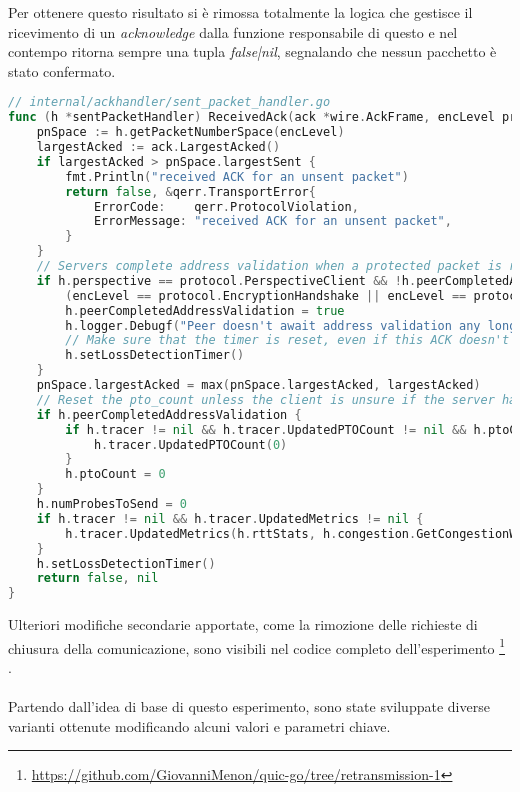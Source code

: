 Per ottenere questo risultato si è rimossa totalmente la logica che gestisce il ricevimento di un \emph{acknowledge} dalla funzione responsabile di questo e nel contempo ritorna sempre una tupla \emph{false|nil}, 
segnalando che nessun pacchetto è stato confermato.
\\
\begin{lstlisting}[language=Go]
// internal/ackhandler/sent_packet_handler.go
func (h *sentPacketHandler) ReceivedAck(ack *wire.AckFrame, encLevel protocol.EncryptionLevel, rcvTime time.Time) (bool /* contained 1-RTT packet */, error) { 
    pnSpace := h.getPacketNumberSpace(encLevel)
    largestAcked := ack.LargestAcked()
    if largestAcked > pnSpace.largestSent {
        fmt.Println("received ACK for an unsent packet")
        return false, &qerr.TransportError{
            ErrorCode:    qerr.ProtocolViolation,
            ErrorMessage: "received ACK for an unsent packet",
        }
    }
    // Servers complete address validation when a protected packet is received.
    if h.perspective == protocol.PerspectiveClient && !h.peerCompletedAddressValidation &&
        (encLevel == protocol.EncryptionHandshake || encLevel == protocol.Encryption1RTT) {
        h.peerCompletedAddressValidation = true
        h.logger.Debugf("Peer doesn't await address validation any longer.")
        // Make sure that the timer is reset, even if this ACK doesn't acknowledge any (ack-eliciting) packets.
        h.setLossDetectionTimer()
    }
    pnSpace.largestAcked = max(pnSpace.largestAcked, largestAcked)
    // Reset the pto_count unless the client is unsure if the server has validated the client's address.
	if h.peerCompletedAddressValidation {
		if h.tracer != nil && h.tracer.UpdatedPTOCount != nil && h.ptoCount != 0 {
			h.tracer.UpdatedPTOCount(0)
		}
		h.ptoCount = 0
	}
	h.numProbesToSend = 0
	if h.tracer != nil && h.tracer.UpdatedMetrics != nil {
		h.tracer.UpdatedMetrics(h.rttStats, h.congestion.GetCongestionWindow(), h.bytesInFlight, h.packetsInFlight())
	}
	h.setLossDetectionTimer()
	return false, nil
}
\end{lstlisting}
\noindent Ulteriori modifiche secondarie apportate, come la rimozione delle richieste di chiusura della comunicazione, sono visibili nel codice completo dell'esperimento \footnote{\url{https://github.com/GiovanniMenon/quic-go/tree/retransmission-1}} \cite{site:my-fork}.
\\\\
Partendo dall'idea di base di questo esperimento, sono state sviluppate diverse varianti ottenute modificando alcuni valori e parametri chiave.
